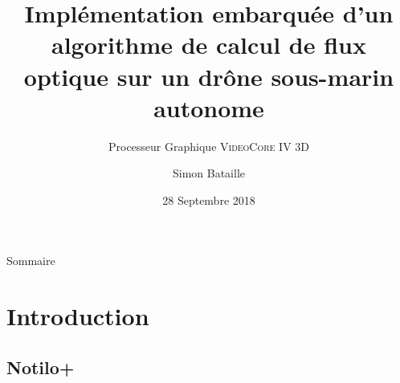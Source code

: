\documentclass{bredelebeamer}
\title[Calcul du flux optique sur Raspbery Pi]{Implémentation embarquée d'un algorithme de calcul de flux optique sur un dr\^one sous-marin autonome}
\subtitle{Processeur Graphique \textsc{VideoCore IV 3D}}
\author{Simon Bataille\inst{1}}
\institute[Université de Caen Normandie]
{
  \inst{1}%
  ESIX NORMANDIE\\
  Département Mécatronique \& Systèmes Nomades
  }
\date{28 Septembre 2018}
\begin{document}
\begin{frame}
  \titlepage
\end{frame}





\begin{frame}{Sommaire}
  \tableofcontents
\end{frame}





\section{Introduction}


	\subsection{Notilo+}

\end{document}
